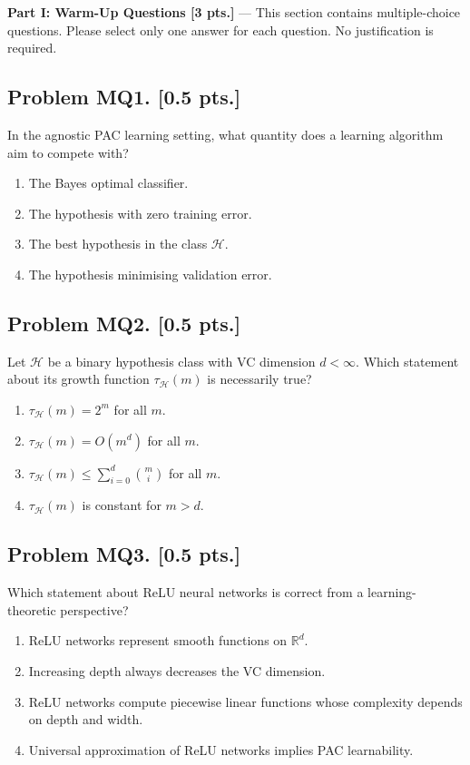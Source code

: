 \documentclass[11pt,a4paper]{article}
\begin{document}
\noindent\textbf{Part I: Warm-Up Questions [3 pts.]} --- This section contains multiple-choice questions.
Please select only one answer for each question. No justification is required.

\subsection{Problem MQ1. [0.5 pts.]}
In the agnostic PAC learning setting, what quantity does a learning algorithm aim to compete with?
\begin{enumerate}[label=(\alph*)]
    \item The Bayes optimal classifier.
    \item The hypothesis with zero training error.
    \item The best hypothesis in the class $\mathcal{H}$.
    \item The hypothesis minimising validation error.
\end{enumerate}

\subsection{Problem MQ2. [0.5 pts.]}
Let $\mathcal{H}$ be a binary hypothesis class with VC dimension $d < \infty$. Which statement about its growth function $\tau_{\mathcal{H}}(m)$ is necessarily true?
\begin{enumerate}[label=(\alph*)]
    \item $\tau_{\mathcal{H}}(m) = 2^m$ for all $m$.
    \item $\tau_{\mathcal{H}}(m) = O(m^d)$ for all $m$.
    \item $\tau_{\mathcal{H}}(m) \le \sum_{i=0}^{d} \binom{m}{i}$ for all $m$.
    \item $\tau_{\mathcal{H}}(m)$ is constant for $m > d$.
\end{enumerate}

\subsection{Problem MQ3. [0.5 pts.]}
Which statement about ReLU neural networks is correct from a learning-theoretic perspective?
\begin{enumerate}[label=(\alph*)]
    \item ReLU networks represent smooth functions on $\mathbb{R}^{d}$.
    \item Increasing depth always decreases the VC dimension.
    \item ReLU networks compute piecewise linear functions whose complexity depends on depth and width.
    \item Universal approximation of ReLU networks implies PAC learnability.
\end{enumerate}
\end{document}
